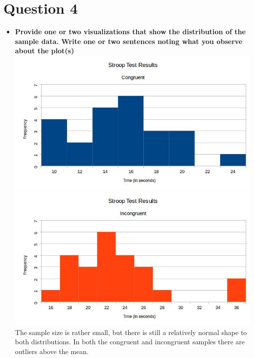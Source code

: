 \documentclass[a4paper,11pt]{report}
\begin{document}
\section{Question 4}
  \begin{itemize}
    \item \textbf{Provide one or two visualizations that show the distribution of the sample data.  Write one or two sentences noting what you observe about the plot(s)}\\
    \includegraphics[scale=.5]{congruent_histogram}\\
    \includegraphics[scale=.5]{incongruent_histogram}\\
    The sample size is rather small, but there is still a relatively normal shape to both distributions.  In both the congruent and incongruent samples there are outliers above the mean.
  \end{itemize}
  
\end{document}
